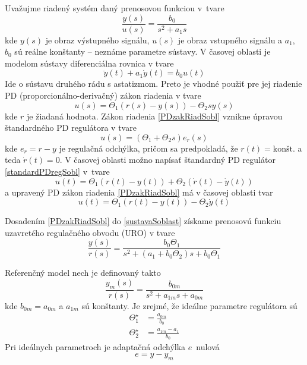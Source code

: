 \documentclass[a4paper, 10pt, ]{article}
\begin{document}
Uvažujme riadený systém daný prenosovou funkciou v~tvare
\begin{equation} \label{sustavaSoblast}
	\frac{y(s)}{u(s)} = \frac{b_0}{s^2 + a_1 s}
\end{equation}
kde $y(s)$ je obraz výstupného signálu, $u(s)$ je obraz vstupného signálu a $a_1$, $b_0$ sú reálne konštanty -- neznáme parametre sústavy.
V časovej oblasti je modelom sústavy diferenciálna rovnica v tvare
\begin{equation} \label{DRsustavyToblast}
	\ddot{y}(t) + a_1 \dot{y}(t) = b_0 u(t)
\end{equation}
Ide o sústavu druhého rádu s astatizmom. Preto je vhodné použiť pre jej riadenie PD (proporcionálno-derivačný) zákon riadenia v tvare
\begin{equation} \label{PDzakRiadSobl}
	u(s) = \Theta_1 \left(r(s)-y(s)\right) - \Theta_2 s y(s)
\end{equation}
kde $r$ je žiadaná hodnota.
Zákon riadenia \eqref{PDzakRiadSobl} vznikne úpravou štandardného PD regulátora v tvare
\begin{equation} \label{standardPDregSobl}
	u(s) = \left(\Theta_1 + \Theta_2 s\right) e_r(s)
\end{equation}
kde $e_r = r-y$ je regulačná odchýlka, pričom sa predpokladá, že $r(t) = \text{konšt.}$ a teda $\dot{r}(t) = 0$. V časovej oblasti možno napísať štandardný PD regulátor \eqref{standardPDregSobl} v~tvare
\begin{equation}
	u(t) = \Theta_1 \left( r(t) - y(t) \right) + \Theta_2 \left( \dot{r}(t) - \dot{y}(t) \right)
\end{equation}
a upravený PD zákon riadenia \eqref{PDzakRiadSobl} má v časovej oblasti tvar
\begin{equation}
	u(t) = \Theta_1 \left( r(t) - y(t) \right) - \Theta_2  \dot{y}(t)
\end{equation}




Dosadením \eqref{PDzakRiadSobl} do \eqref{sustavaSoblast} získame prenosovú funkciu uzavretého regulačného obvodu (URO) v tvare
\begin{equation} \label{uvGradUROSoblast}
	\frac{y(s)}{r(s)} = \frac{b_0 \Theta_1}{s^2 + \left(a_1 + b_0 \Theta_2 \right) s + b_0 \Theta_1}
\end{equation}

Referenčný model nech je definovaný takto
\begin{equation} \label{uvGradRMSoblast}
	\frac{y_m(s)}{r(s)}  =  \frac{b_{0m} }{s^2 + a_{1m} s + a_{0m}}
\end{equation}
kde $b_{0m}=a_{0m}$ a $a_{1m}$ sú konštanty. Je zrejmé, že ideálne parametre regulátora sú
\begin{align}
	\Theta_1^\star &= \frac{a_{0m}}{b_0} \\
	\Theta_2^\star &= \frac{a_{1m} - a_1}{b_0}
\end{align}
Pri ideálnych parametroch je adaptačná odchýlka $e$~nulová
\begin{equation} \label{gradDefAdaptE}
	e = y - y_m
\end{equation}
\end{document}
